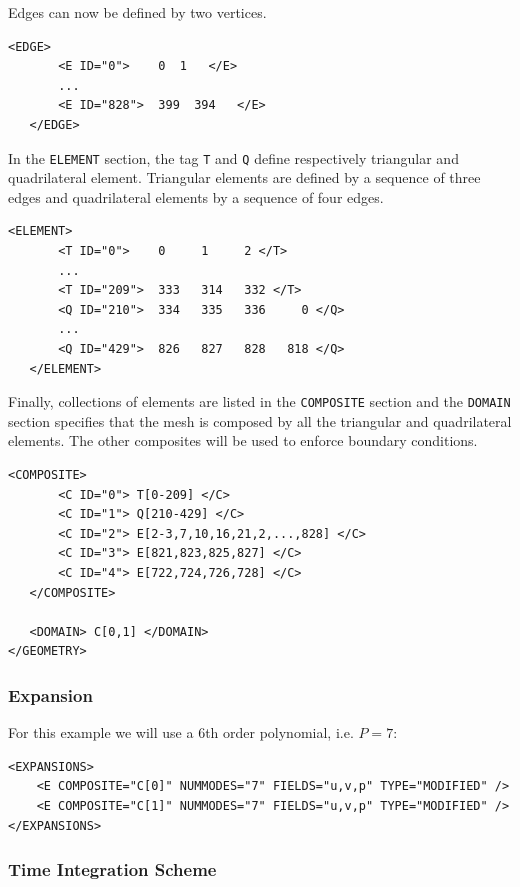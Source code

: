 Edges can now be defined by two vertices.

      \begin{lstlisting}[style=XMLStyle]
<EDGE>
       <E ID="0">    0  1   </E>
       ...
       <E ID="828">  399  394   </E>
   </EDGE>
        \end{lstlisting}

In the \texttt{ELEMENT} section, the tag \texttt{T} and \texttt{Q} define respectively triangular and quadrilateral element. Triangular elements are defined by a sequence of three edges and quadrilateral elements by a sequence of four edges.

      \begin{lstlisting}[style=XMLStyle]
<ELEMENT>
       <T ID="0">    0     1     2 </T>
       ...
       <T ID="209">  333   314   332 </T>
       <Q ID="210">  334   335   336     0 </Q>
       ...
       <Q ID="429">  826   827   828   818 </Q>
   </ELEMENT>
        \end{lstlisting}

Finally, collections of elements are listed in the \texttt{COMPOSITE} section and the \texttt{DOMAIN} section specifies that the mesh is composed by all the triangular and quadrilateral elements. The other composites will be used to enforce boundary conditions.

      \begin{lstlisting}[style=XMLStyle]
<COMPOSITE>
       <C ID="0"> T[0-209] </C>
       <C ID="1"> Q[210-429] </C>
       <C ID="2"> E[2-3,7,10,16,21,2,...,828] </C>
       <C ID="3"> E[821,823,825,827] </C>
       <C ID="4"> E[722,724,726,728] </C>
   </COMPOSITE>

   <DOMAIN> C[0,1] </DOMAIN>
</GEOMETRY>
        \end{lstlisting}

\subsubsection{Expansion}

For this example we will use a 6th order polynomial, i.e. $P=7$:

      \begin{lstlisting}[style=XMLStyle]
<EXPANSIONS>
    <E COMPOSITE="C[0]" NUMMODES="7" FIELDS="u,v,p" TYPE="MODIFIED" />
    <E COMPOSITE="C[1]" NUMMODES="7" FIELDS="u,v,p" TYPE="MODIFIED" />
</EXPANSIONS>
        \end{lstlisting}

\subsubsection{Time Integration Scheme}

